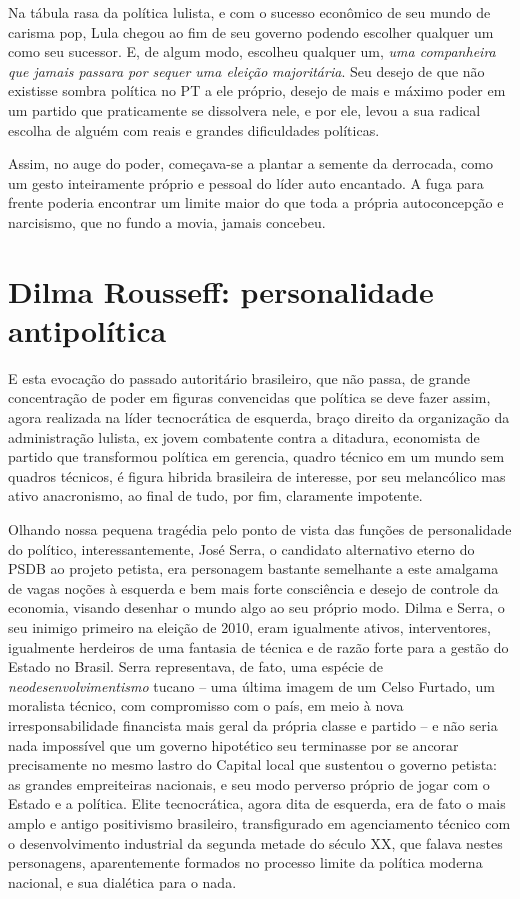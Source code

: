 Na tábula rasa da política lulista, e com o sucesso econômico de seu
mundo de carisma pop, Lula chegou ao fim de seu governo podendo escolher
qualquer um como seu sucessor. E, de algum modo, escolheu qualquer um,
\emph{uma companheira que jamais passara por sequer uma eleição}
\emph{majoritária}. Seu desejo de que não existisse sombra política no
PT a ele próprio, desejo de mais e máximo poder em um partido que
praticamente se dissolvera nele, e por ele, levou a sua radical escolha
de alguém com reais e grandes dificuldades políticas.

Assim, no auge do poder, começava-se a plantar a semente da derrocada,
como um gesto inteiramente próprio e pessoal do líder auto encantado. A
fuga para frente poderia encontrar um limite maior do que toda a própria
autoconcepção e narcisismo, que no fundo a movia, jamais concebeu.

\chapter{Dilma Rousseff: personalidade
antipolítica}\label{dilma-rousseff-personalidade-antipoluxedtica}

E esta evocação do passado autoritário brasileiro, que não passa, de
grande concentração de poder em figuras convencidas que política se deve
fazer assim, agora realizada na líder tecnocrática de esquerda, braço
direito da organização da administração lulista, ex jovem combatente
contra a ditadura, economista de partido que transformou política em
gerencia, quadro técnico em um mundo sem quadros técnicos, é figura
hibrida brasileira de interesse, por seu melancólico mas ativo
anacronismo, ao final de tudo, por fim, claramente impotente.

Olhando nossa pequena tragédia pelo ponto de vista das funções de
personalidade do político, interessantemente, José Serra, o candidato
alternativo eterno do PSDB ao projeto petista, era personagem bastante
semelhante a este amalgama de vagas noções à esquerda e bem mais forte
consciência e desejo de controle da economia, visando desenhar o mundo
algo ao seu próprio modo. Dilma e Serra, o seu inimigo primeiro na
eleição de 2010, eram igualmente ativos, interventores, igualmente
herdeiros de uma fantasia de técnica e de razão forte para a gestão do
Estado no Brasil. Serra representava, de fato, uma espécie de
\emph{neodesenvolvimentismo} tucano -- uma última imagem de um Celso
Furtado, um moralista técnico, com compromisso com o país, em meio à
nova irresponsabilidade financista mais geral da própria classe e
partido -- e não seria nada impossível que um governo hipotético seu
terminasse por se ancorar precisamente no mesmo lastro do Capital local
que sustentou o governo petista: as grandes empreiteiras nacionais, e
seu modo perverso próprio de jogar com o Estado e a política. Elite
tecnocrática, agora dita de esquerda, era de fato o mais amplo e antigo
positivismo brasileiro, transfigurado em agenciamento técnico com o
desenvolvimento industrial da segunda metade do século XX, que falava
nestes personagens, aparentemente formados no processo limite da
política moderna nacional, e sua dialética para o nada.

